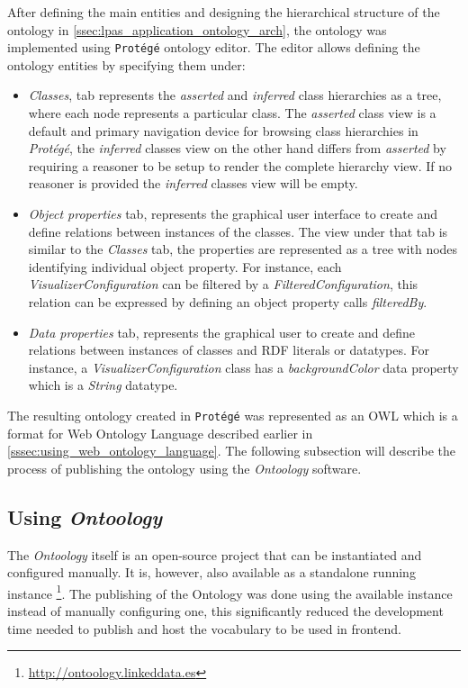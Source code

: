 After defining the main entities and designing the hierarchical structure of the ontology in \autoref{ssec:lpas_application_ontology_arch}, the ontology was implemented using \texttt{Protégé} ontology editor. The editor allows defining the ontology entities by specifying them under:
\begin{itemize}
    \item \textit{Classes}, tab represents the \textit{asserted} and \textit{inferred} class hierarchies as a tree, where each node represents a particular class. The \textit{asserted} class view is a default and primary navigation device for browsing class hierarchies in \textit{Protégé}, the \textit{inferred} classes view on the other hand differs from \textit{asserted} by requiring a reasoner to be setup to render the complete hierarchy view. If no reasoner is provided the \textit{inferred} classes view will be empty.
    \item \textit{Object properties} tab,  represents the graphical user interface to create and define relations between instances of the classes. The view under that tab is similar to the \textit{Classes} tab, the properties are represented as a tree with nodes identifying individual object property. For instance, each \textit{VisualizerConfiguration} can be filtered by a \textit{FilteredConfiguration}, this relation can be expressed by defining an object property calls \textit{filteredBy}.
    \item \textit{Data properties} tab, represents the graphical user to create and define relations between instances of classes and RDF literals or datatypes. For instance, a \textit{VisualizerConfiguration} class has a \textit{backgroundColor} data property which is a \textit{String} datatype. 
\end{itemize}

The resulting ontology created in \texttt{Protégé} was represented as an OWL which is a format for Web Ontology Language described earlier in \autoref{sssec:using_web_ontology_language}. The following subsection will describe the process of publishing the ontology using the \textit{Ontoology} software. 

\subsection{Using \textit{Ontoology}}

The \textit{Ontoology} itself is an open-source project that can be instantiated and configured manually. It is, however, also available as a standalone running instance \footnote{\url{http://ontoology.linkeddata.es}}. The publishing of the \lpas{} Ontology was done using the available instance instead of manually configuring one, this significantly reduced the development time needed to publish and host the vocabulary to be used in \lpa{} frontend.

